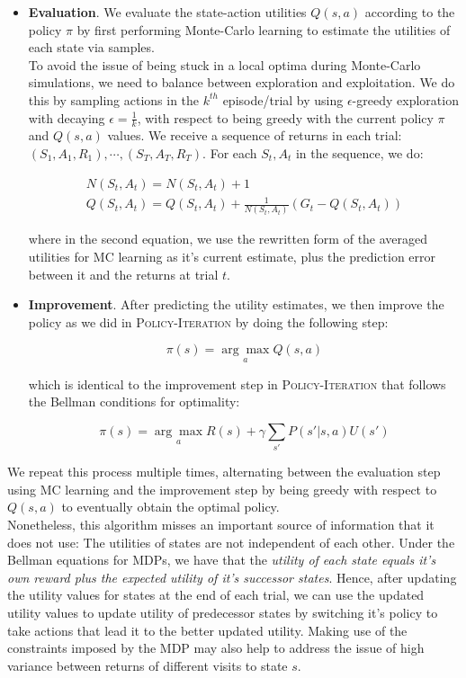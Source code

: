 \documentclass[11pt]{article}
\begin{document}
\begin{itemize}
    \item \textbf{Evaluation}. We evaluate the state-action utilities $Q(s, a)$ according to the policy $\pi$ by first performing Monte-Carlo learning to estimate the utilities of each state via samples.\\
    
    To avoid the issue of being stuck in a local optima during Monte-Carlo simulations, we need to balance between exploration and exploitation. We do this by sampling actions in the $k^{th}$ episode/trial by using $\epsilon$-greedy exploration with decaying $\epsilon = \frac{1}{k}$, with respect to being greedy with the current policy $\pi$ and $Q(s, a)$ values. We receive a sequence of returns in each trial: $(S_1, A_1, R_1), \cdots, (S_T, A_T, R_T)$. For each $S_t, A_t$ in the sequence, we do:
    
    $$
    \begin{gathered}
    N(S_t, A_t) = N(S_t, A_t) + 1\\
    Q(S_t, A_t) = Q(S_t, A_t) + \frac{1}{N(S_t, A_t)}(G_t - Q(S_t, A_t))
    \end{gathered}
    $$
    
    where in the second equation, we use the rewritten form of the averaged utilities for MC learning as it's current estimate, plus the prediction error between it and the returns at trial $t$.
    
    \item \textbf{Improvement}. After predicting the utility estimates, we then improve the policy as we did in \textsc{Policy-Iteration} by doing the following step:
    
    $$
    \pi(s) = \underset{a}{\arg\max} Q(s, a)
    $$
    
    which is identical to the improvement step in \textsc{Policy-Iteration} that follows the Bellman conditions for optimality:
    
    $$
    \pi(s) = \underset{a}{\arg\max} R(s) + \gamma \sum_{s'} P(s' | s, a) U(s')
    $$
    
\end{itemize}

We repeat this process multiple times, alternating between the evaluation step using MC learning and the improvement step by being greedy with respect to $Q(s, a)$ to eventually obtain the optimal policy.\\

Nonetheless, this algorithm misses an important source of information that it does not use: The utilities of states are not independent of each other. Under the Bellman equations for MDPs, we have that the \textit{utility of each state equals it's own reward plus the expected utility of it's successor states}. Hence, after updating the utility values for states at the end of each trial, we can use the updated utility values to update utility of predecessor states by switching it's policy to take actions that lead it to the better updated utility. Making use of the constraints imposed by the MDP may also help to address the issue of high variance between returns of different visits to state $s$.
\end{document}
